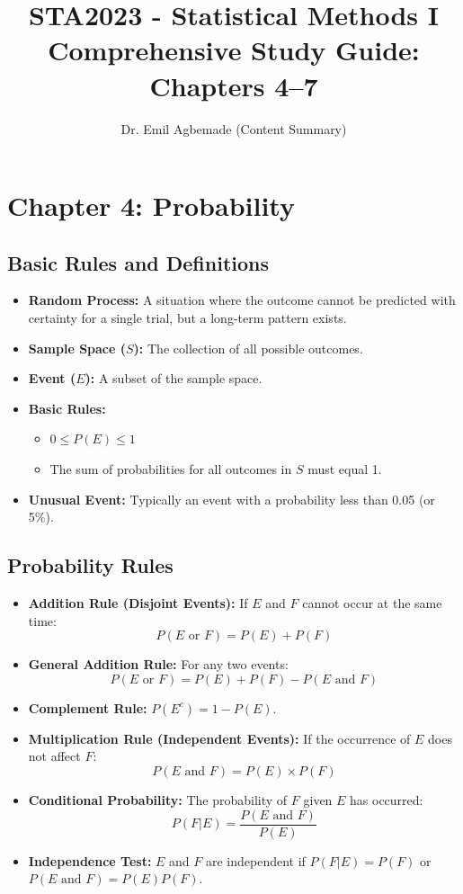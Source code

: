 \documentclass[11pt]{article}
\title{STA2023 - Statistical Methods I\\ \Large Comprehensive Study Guide: Chapters 4--7}
\author{Dr. Emil Agbemade (Content Summary)}
\date{}
\begin{document}
\maketitle

\section{Chapter 4: Probability}
\subsection{Basic Rules and Definitions}
\begin{itemize}
    \item \textbf{Random Process:} A situation where the outcome cannot be predicted with certainty for a single trial, but a long-term pattern exists.
    \item \textbf{Sample Space ($S$):} The collection of all possible outcomes.
    \item \textbf{Event ($E$):} A subset of the sample space.
    \item \textbf{Basic Rules:} 
        \begin{itemize}
            \item $0 \leq P(E) \leq 1$
            \item The sum of probabilities for all outcomes in $S$ must equal 1.
        \end{itemize}
    \item \textbf{Unusual Event:} Typically an event with a probability less than 0.05 (or 5\%).
\end{itemize}

\subsection{Probability Rules}
\begin{itemize}
    \item \textbf{Addition Rule (Disjoint Events):} If $E$ and $F$ cannot occur at the same time:
    \[ P(E \text{ or } F) = P(E) + P(F) \]
    \item \textbf{General Addition Rule:} For any two events:
    \[ P(E \text{ or } F) = P(E) + P(F) - P(E \text{ and } F) \]
    \item \textbf{Complement Rule:} $P(E^c) = 1 - P(E)$.
    \item \textbf{Multiplication Rule (Independent Events):} If the occurrence of $E$ does not affect $F$:
    \[ P(E \text{ and } F) = P(E) \times P(F) \]
    \item \textbf{Conditional Probability:} The probability of $F$ given $E$ has occurred:
    \[ P(F|E) = \frac{P(E \text{ and } F)}{P(E)} \]
    \item \textbf{Independence Test:} $E$ and $F$ are independent if $P(F|E) = P(F)$ or $P(E \text{ and } F) = P(E)P(F)$.
\end{itemize}
\end{document}

